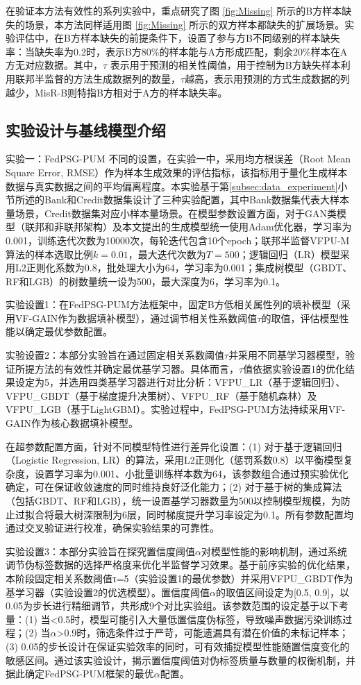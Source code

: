 在验证本方法有效性的系列实验中，重点研究了图 \ref{fig:Missing} 所示的B方样本缺失的场景，本方法同样适用图 \ref{fig:Missing} 所示的双方样本都缺失的扩展场景。实验评估中，在B方样本缺失的前提条件下，设置了参与方B不同级别的样本缺失率：当缺失率为0.2时，表示B方80\%的样本能与A方形成匹配，剩余20\%样本在A方无对应数据。其中，$\tau$ 表示用于预测的相关性阈值，用于控制为B方缺失样本利用联邦半监督的方法生成数据列的数量，$\tau$越高，表示用预测的方式生成数据的列越少，MisR-B则特指B方相对于A方的样本缺失率。
\subsection{实验设计与基线模型介绍}
实验一：FedPSG-PUM 不同的设置，在实验一中，采用均方根误差（Root Mean Square Error, RMSE）作为样本生成效果的评估指标，该指标用于量化生成样本数据与真实数据之间的平均偏离程度。本实验基于第\ref{subsec:data_experiment}小节所述的Bank和Credit数据集设计了三种实验配置，其中Bank数据集代表大样本量场景，Credit数据集对应小样本量场景。在模型参数设置方面，对于GAN类模型（联邦和非联邦架构）及本文提出的生成模型统一使用Adam优化器，学习率为0.001，训练迭代次数为10000次，每轮迭代包含10个epoch；联邦半监督VFPU-M算法的样本选取比例$k=0.01$，最大迭代次数为$T=500$；逻辑回归（LR）模型采用L2正则化系数为0.8，批处理大小为64，学习率为0.001；集成树模型（GBDT、RF和LGB）的树数量统一设为500，最大深度为6，学习率为0.1。

实验设置1：在FedPSG-PUM方法框架中，固定B方低相关属性列的填补模型（采用VF-GAIN作为数据填补模型），通过调节相关性系数阈值$\tau$的取值，评估模型性能以确定最优参数配置。

实验设置2：本部分实验旨在通过固定相关系数阈值$\tau$并采用不同基学习器模型，验证所提方法的有效性并确定最优基学习器。具体而言，$\tau$值依据实验设置1的优化结果设定为5，并选用四类基学习器进行对比分析：VFPU\_LR（基于逻辑回归）、VFPU\_GBDT（基于梯度提升决策树）、VFPU\_RF（基于随机森林）及VFPU\_LGB（基于LightGBM）。实验过程中，FedPSG-PUM方法持续采用VF-GAIN作为核心数据填补模型。

在超参数配置方面，针对不同模型特性进行差异化设置：(1) 对于基于逻辑回归（Logistic Regression, LR）的算法，采用L2正则化（惩罚系数0.8）以平衡模型复杂度，设置学习率为0.001、小批量训练样本数为64，该参数组合通过预实验优化确定，可在保证收敛速度的同时维持良好泛化能力；(2) 对于基于树的集成算法（包括GBDT、RF和LGB），统一设置基学习器数量为500以控制模型规模，为防止过拟合将最大树深限制为6层，同时梯度提升学习率设定为0.1。所有参数配置均通过交叉验证进行校准，确保实验结果的可靠性。

实验设置3：本部分实验旨在探究置信度阈值$\alpha$对模型性能的影响机制，通过系统调节伪标签数据的选择严格度来优化半监督学习效果。基于前序实验的优化结果，本阶段固定相关系数阈值τ=5（实验设置1的最优参数）并采用VFPU\_GBDT作为基学习器（实验设置2的优选模型）。置信度阈值$\alpha$的取值区间设定为[0.5, 0.9]，以0.05为步长进行精细调节，共形成9个对比实验组。该参数范围的设定基于以下考量：(1) 当<0.5时，模型可能引入大量低置信度伪标签，导致噪声数据污染训练过程；(2) 当$\alpha$>0.9时，筛选条件过于严苛，可能遗漏具有潜在价值的未标记样本；(3) 0.05的步长设计在保证实验效率的同时，可有效捕捉模型性能随置信度变化的敏感区间。通过该实验设计，揭示置信度阈值对伪标签质量与数量的权衡机制，并据此确定FedPSG-PUM框架的最优$\alpha$配置。

